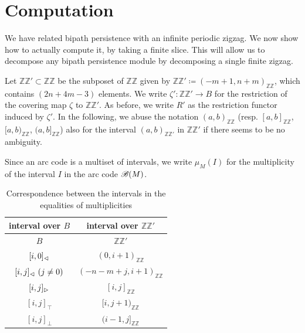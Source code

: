 \documentclass[a4paper,english,reqno]{amsart}
\newcommand\ze{\zeta}
\newcommand\ZZ{\mathbb{ZZ}}
\theoremstyle{plain}
\theoremstyle{definition} %
\newcommand{\slice}[1]{{#1}'} %
\begin{document}
\section{Computation}\label{sec:computation}
We have related bipath persistence with an infinite periodic zigzag. We now show how to actually compute it, by taking a finite slice. This will allow us to decompose any bipath persistence module by decomposing a single finite zigzag.

Let $\slice{\ZZ}\subset\ZZ$ be the subposet of $\ZZ$ given by $\slice{\ZZ}\coloneqq (-m+1, n+m)_{\ZZ}$, which contains $(2n+4m-3)$ elements. We write $\slice{\zeta}\colon\slice{\ZZ} \to B$ for the restriction of the covering map $\zeta$ to $\slice{\ZZ}$. As before, we write $\slice{R}$ as the restriction functor induced by $\slice{\ze}$. In the following, we abuse the notation $(a,b)_{\ZZ}$ (resp. $[a,b]_{\ZZ}$, $[a,b)_{\ZZ}$, $(a,b]_{\ZZ}$) also for the interval $(a,b)_{\slice{\ZZ}}$ in $\slice{\ZZ}$ if there seems to be no ambiguity.

Since an arc code is a multiset of intervals, we write $\mu_{M}(I)$ for the multiplicity of the interval $I$ in the arc code $\mathcal{B}(M)$.

\begin{table}
\centering
\begin{tabular}{cc}
\hline
interval over $B$ & interval over $\slice{\ZZ}$ \\ \hline
\( B \) & \( \slice{\ZZ} \) \\
\( [i, 0]_{\vartriangleleft} \) & \( (0, i + 1)_{\ZZ} \) \\
\( [i, j]_{\vartriangleleft}\ (j\neq 0) \) & \( (- n - m + j, i + 1)_{\ZZ} \) \\
\( [i, j]_{\vartriangleright} \) & \( [i, j]_{\ZZ} \) \\
\( [i,j]_{\top} \) & \( [i, j + 1)_{\ZZ} \) \\
\( [i,j]_{\bot} \) & \( (i - 1, j]_{\ZZ} \) \\ \hline
\end{tabular}
\caption{Correspondence between the intervals in the equalities of multiplicities}\label{tab:equalities}
\end{table}
\end{document}
